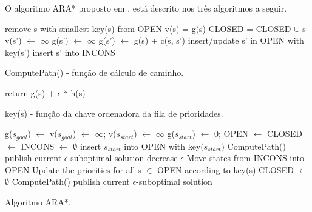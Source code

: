O algoritmo ARA* proposto em , está descrito nos três algoritmos a seguir.

\begin{algorithm}[H]
\SetAlgoLined
{
	remove s with smallest key(s) from OPEN\;
	v(s) = g(s)\; CLOSED = CLOSED $\cup$ {s}\;
	{
		{
			v(s') $\leftarrow$ $\infty$\;
			g(s') $\leftarrow$ $\infty$\;
		}
		{
			g(s') $\leftarrow$ g(s) + c(s, s')\;
			{
				insert/update s' in OPEN with key(s')\;
			}
			{
				insert s' into INCONS\;
			}
		}
	}
}
\caption{ComputePath() - função de cálculo de caminho.}
\end{algorithm}



\begin{algorithm}[H]
\SetAlgoLined
return g(s) + $\epsilon$ * h(s)\;
\caption{key(s) - função da chave ordenadora da fila de prioridades.}
\end{algorithm}

\newpage
\begin{algorithm}[H]
\SetAlgoLined
g($s_{goal}$) $\leftarrow$ v($s_{goal}$) $\leftarrow$ $\infty$; v($s_{start}$) $\leftarrow$ $\infty$\;
g($s_{start}$) $\leftarrow$ 0; OPEN $\leftarrow$ CLOSED $\leftarrow$ INCONS $\leftarrow$ $\emptyset$\;
insert $s_{start}$ into OPEN with key($s_{start}$)\;
ComputePath()\;
publish current $\epsilon$-suboptimal solution\;
{
	decrease $\epsilon$\;
	Move states from INCONS into OPEN\;
	Update the priorities for all s $\in$ OPEN according to key(s)\;
	CLOSED $\leftarrow$ $\emptyset$\;
	ComputePath()\;
	publish current $\epsilon$-suboptimal solution\;
}
\caption{Algoritmo ARA*.}
\end{algorithm}

